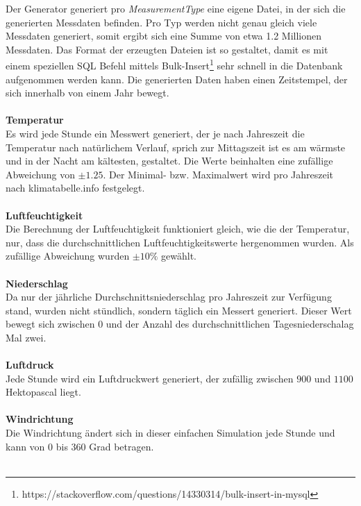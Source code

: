 Der Generator generiert pro \textit{MeasurementType} eine eigene Datei, in der sich die generierten Messdaten befinden. Pro Typ werden nicht genau gleich viele Messdaten generiert, somit ergibt sich eine Summe von etwa 1.2 Millionen Messdaten. Das Format der erzeugten Dateien ist so gestaltet, damit es mit einem speziellen SQL Befehl mittels Bulk-Insert\footnote{https://stackoverflow.com/questions/14330314/bulk-insert-in-mysql} sehr schnell in die Datenbank aufgenommen werden kann. Die generierten Daten haben einen Zeitstempel, der sich innerhalb von einem Jahr bewegt.~\\~\\ %

\textbf{Temperatur}\\
Es wird jede Stunde ein Messwert generiert, der je nach Jahreszeit die Temperatur nach natürlichem Verlauf, sprich zur Mittagszeit ist es am wärmste und in der Nacht am kältesten, gestaltet. Die Werte beinhalten eine zufällige Abweichung von $\pm 1.25$. Der Minimal- bzw. Maximalwert wird pro Jahreszeit nach klimatabelle.info festgelegt.~\\~\\ %

\textbf{Luftfeuchtigkeit}\\
Die Berechnung der Luftfeuchtigkeit funktioniert gleich, wie die der Temperatur, nur, dass die durchschnittlichen Luftfeuchtigkeitswerte hergenommen wurden. Als zufällige Abweichung wurden $\pm10\%$ gewählt.~\\~\\ %

\textbf{Niederschlag}\\
Da nur der jährliche Durchschnittsniederschlag pro Jahreszeit zur Verfügung stand, wurden nicht stündlich, sondern täglich ein Messert generiert. Dieser Wert bewegt sich zwischen $0$ und der Anzahl des durchschnittlichen Tagesniederschalag Mal zwei.~\\~\\ %

\textbf{Luftdruck}\\
Jede Stunde wird ein Luftdruckwert generiert, der zufällig zwischen $900$ und $1100$ Hektopascal liegt.~\\~\\ %

\textbf{Windrichtung}\\
Die Windrichtung ändert sich in dieser einfachen Simulation jede Stunde und kann von $0$ bis $360$ Grad betragen.~\\~\\ %

